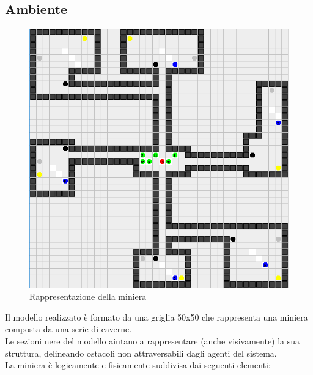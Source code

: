 \documentclass{llncs}
\begin{document}
\subsection{Ambiente}
\begin{figure}[htbp]
  \centering
   \includegraphics[scale = 0.55]{img/miniera.png}
  \caption{Rappresentazione della miniera}
\end{figure}
Il modello realizzato è formato da una griglia 50x50 che rappresenta una miniera composta da una serie di caverne.\\
Le sezioni nere del modello aiutano a rappresentare (anche visivamente) la sua struttura, delineando ostacoli non attraversabili dagli agenti del sistema.\\
La miniera è logicamente e fisicamente suddivisa dai seguenti elementi:
\end{document}
